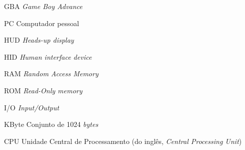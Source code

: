 \begin{siglas}
  \item[GBA] \textit{Game Boy Advance}
  \item[PC] Computador pessoal
  \item[HUD] \textit{Heads-up display}
  \item[HID] \textit{Human interface device}
  \item[RAM] \textit{Random Access Memory}
  \item[ROM] \textit{Read-Only memory}
  \item[I/O] \textit{Input/Output}
  \item[KByte] Conjunto de 1024 \textit{bytes}
  \item[CPU] Unidade Central de Processamento (do inglês, \textit{Central Processing Unit})
\end{siglas}
